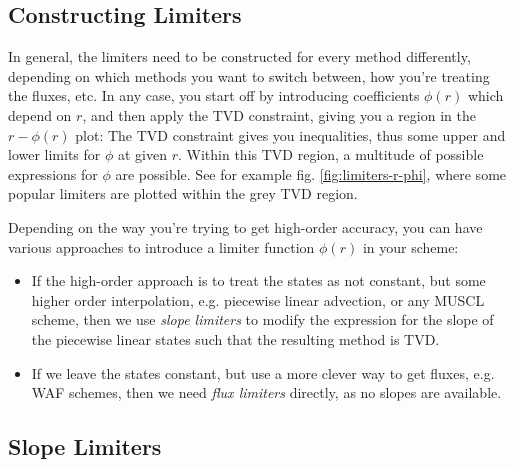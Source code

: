 \subsection{Constructing Limiters}


In general, the limiters need to be constructed for every method differently, depending on which methods you want to switch between, how you're treating the fluxes, etc.
In any case, you start off by introducing coefficients $\phi(r)$ which depend on $r$, and then apply the TVD constraint, giving you a region in the $r-\phi(r)$ plot:
The TVD constraint gives you inequalities, thus some upper and lower limits for $\phi$ at given $r$.
Within this TVD region, a multitude of possible expressions for $\phi$ are possible.
See for example fig. \ref{fig:limiters-r-phi}, where some popular limiters are plotted within the grey TVD region.



Depending on the way you're trying to get high-order accuracy, you can have various approaches to introduce a limiter function $\phi(r)$ in your scheme:

\begin{itemize}
	\item 	If the high-order approach is to treat the states as not constant, but some higher order interpolation, e.g. piecewise linear advection, or any MUSCL scheme, then we use \emph{slope limiters} to modify the expression for the slope of the piecewise linear states such that the resulting method is TVD.
	\item 	If we leave the states constant, but use a more clever way to get fluxes, e.g. WAF schemes, then we need \emph{flux limiters} directly, as no slopes are available.
\end{itemize}

















\subsection{Slope Limiters}\label{chap:slope_limiters}




